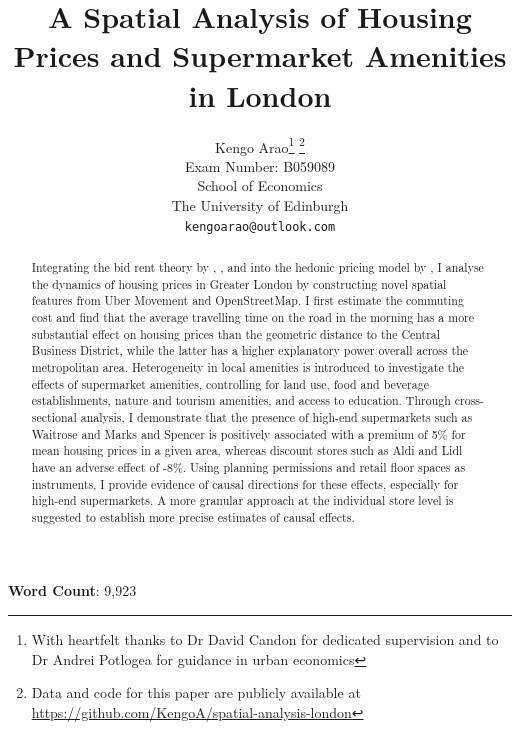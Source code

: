 \documentclass{article}
\title{A Spatial Analysis of Housing Prices and Supermarket Amenities in London}
\author{
  \large{Kengo Arao}\thanks{With heartfelt thanks to Dr David Candon for dedicated supervision and to Dr Andrei Potlogea for guidance in urban economics}      \thanks{Data and code for this paper are publicly available at \href{https://github.com/KengoA/spatial-analysis-london}{https://github.com/KengoA/spatial-analysis-london}} \\
  Exam Number: B059089 \\
  School of Economics\\
  The University of Edinburgh\\
  \texttt{kengoarao@outlook.com}
}
\begin{document}
\maketitle

\begin{abstract}
Integrating the bid rent theory by \citet{AlonsoWilliam1964Lalu}, \citet{MuthRichardF.1969Cah:}, and \citet{MillsEdwinSmith1972Sits} into the hedonic pricing model by \citet{Rosen1984}, I analyse the dynamics of housing prices in Greater London by constructing novel spatial features from Uber Movement and OpenStreetMap. I first estimate the commuting cost and find that the average travelling time on the road in the morning has a more substantial effect on housing prices than the geometric distance to the Central Business District, while the latter has a higher explanatory power overall across the metropolitan area. Heterogeneity in local amenities is introduced to investigate the effects of supermarket amenities, controlling for land use, food and beverage establishments, nature and tourism amenities, and access to education. Through cross-sectional analysis, I demonstrate that the presence of high-end supermarkets such as Waitrose and Marks and Spencer is positively associated with a premium of 5\% for mean housing prices in a given area, whereas discount stores such as Aldi and Lidl have an adverse effect of -8\%. Using planning permissions and retail floor spaces as instruments, I provide evidence of causal directions for these effects, especially for high-end supermarkets. A more granular approach at the individual store level is suggested to establish more precise estimates of causal effects.

\end{abstract}

\begin{center}
    \textbf{Word Count}: 9,923
\end{center}

\newpage
\tableofcontents

\newpage
\end{document}

